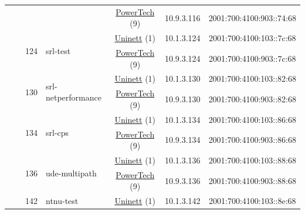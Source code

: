 \begin{small}
\begin{center}
\begin{longtable}{|c|c|c|c|c|c|c|c|}
  &  &  &  & \multicolumn{2}{|c|}{\tiny{\href{http://www.powertech.no}{PowerTech} (9)}} & \tiny{10.9.3.116} & \tiny{2001:700:4100:903::74:68} \\* \cline{3-3}\cline{4-4}\cline{5-5}\cline{6-6}\cline{7-7}\cline{8-8}
  &  & \multirow{2}{*}{\tiny{124}} & \multicolumn{1}{|l|}{\multirow{2}{*}{\tiny{srl-test}}} & \multicolumn{2}{|c|}{\tiny{\href{https://www.uninett.no}{Uninett} (1)}} & \tiny{10.1.3.124} & \tiny{2001:700:4100:103::7c:68} \\* \cline{5-5}\cline{6-6}\cline{7-7}\cline{8-8}
  &  &  &  & \multicolumn{2}{|c|}{\tiny{\href{http://www.powertech.no}{PowerTech} (9)}} & \tiny{10.9.3.124} & \tiny{2001:700:4100:903::7c:68} \\* \cline{3-3}\cline{4-4}\cline{5-5}\cline{6-6}\cline{7-7}\cline{8-8}
  &  & \multirow{2}{*}{\tiny{130}} & \multicolumn{1}{|l|}{\multirow{2}{*}{\tiny{srl-netperformance}}} & \multicolumn{2}{|c|}{\tiny{\href{https://www.uninett.no}{Uninett} (1)}} & \tiny{10.1.3.130} & \tiny{2001:700:4100:103::82:68} \\* \cline{5-5}\cline{6-6}\cline{7-7}\cline{8-8}
  &  &  &  & \multicolumn{2}{|c|}{\tiny{\href{http://www.powertech.no}{PowerTech} (9)}} & \tiny{10.9.3.130} & \tiny{2001:700:4100:903::82:68} \\* \cline{3-3}\cline{4-4}\cline{5-5}\cline{6-6}\cline{7-7}\cline{8-8}
  &  & \multirow{2}{*}{\tiny{134}} & \multicolumn{1}{|l|}{\multirow{2}{*}{\tiny{srl-cps}}} & \multicolumn{2}{|c|}{\tiny{\href{https://www.uninett.no}{Uninett} (1)}} & \tiny{10.1.3.134} & \tiny{2001:700:4100:103::86:68} \\* \cline{5-5}\cline{6-6}\cline{7-7}\cline{8-8}
  &  &  &  & \multicolumn{2}{|c|}{\tiny{\href{http://www.powertech.no}{PowerTech} (9)}} & \tiny{10.9.3.134} & \tiny{2001:700:4100:903::86:68} \\* \cline{3-3}\cline{4-4}\cline{5-5}\cline{6-6}\cline{7-7}\cline{8-8}
  &  & \multirow{2}{*}{\tiny{136}} & \multicolumn{1}{|l|}{\multirow{2}{*}{\tiny{ude-multipath}}} & \multicolumn{2}{|c|}{\tiny{\href{https://www.uninett.no}{Uninett} (1)}} & \tiny{10.1.3.136} & \tiny{2001:700:4100:103::88:68} \\* \cline{5-5}\cline{6-6}\cline{7-7}\cline{8-8}
  &  &  &  & \multicolumn{2}{|c|}{\tiny{\href{http://www.powertech.no}{PowerTech} (9)}} & \tiny{10.9.3.136} & \tiny{2001:700:4100:903::88:68} \\* \cline{3-3}\cline{4-4}\cline{5-5}\cline{6-6}\cline{7-7}\cline{8-8}
  &  & \multirow{2}{*}{\tiny{142}} & \multicolumn{1}{|l|}{\multirow{2}{*}{\tiny{ntnu-test}}} & \multicolumn{2}{|c|}{\tiny{\href{https://www.uninett.no}{Uninett} (1)}} & \tiny{10.1.3.142} & \tiny{2001:700:4100:103::8e:68} \\* \cline{5-5}\cline{6-6}\cline{7-7}\cline{8-8}

\end{longtable}
\end{center}
\end{small}
